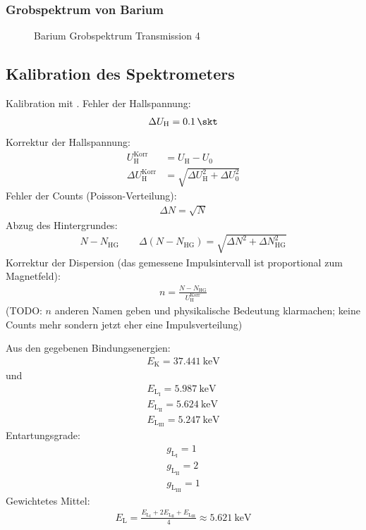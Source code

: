 \documentclass[11pt, a4paper]{article}
\numberwithin{equation}{section}
\begin{document}
\subsubsection{Grobspektrum von Barium}
\begin{figure}[h]
	\centering
	
	\caption{Barium Grobspektrum Transmission 4}
	\label{fig:ba_t4_grob}
\end{figure}

\subsection{Kalibration des Spektrometers}
Kalibration mit .
Fehler der Hallspannung:
\begin{align}
	\Delta U_\mathrm{H} = \SI{0.1}{\skt}
\end{align}
Korrektur der Hallspannung:
\begin{align}
	U_\mathrm{H}^\mathrm{Korr} &= U_\mathrm{H} - U_0 \\
	\Delta U_\mathrm{H}^\mathrm{Korr} &= \sqrt{\Delta U_\mathrm{H}^2 + \Delta U_0^2}
\end{align}
Fehler der Counts (Poisson-Verteilung):
\begin{align}
	\Delta N = \sqrt{N}
\end{align}
Abzug des Hintergrundes:
\begin{align}
	N - N_\mathrm{HG} \qquad \Delta(N - N_\mathrm{HG}) = \sqrt{\Delta N^2 + \Delta N_\mathrm{HG}^2}
\end{align}
Korrektur der Dispersion (das gemessene Impulsintervall ist proportional zum Magnetfeld):
\begin{align}
	n = \frac{N-N_\mathrm{HG}}{U_\mathrm{H}^\mathrm{Korr}}
\end{align}
(TODO: $n$ anderen Namen geben und physikalische Bedeutung klarmachen; keine Counts mehr sondern jetzt eher eine Impulsverteilung)

Aus den gegebenen Bindungsenergien:
\begin{align*}
	E_\mathrm{K} = \SI{37,441}{\kilo\electronvolt}
\end{align*}
und
\begin{align*}
	E_{\mathrm{L}_{\mathrm{I}}} = \SI{5,987}{\kilo\electronvolt} \\
	E_{\mathrm{L}_{\mathrm{II}}} = \SI{5,624}{\kilo\electronvolt} \\
	E_{\mathrm{L}_{\mathrm{III}}} = \SI{5,247}{\kilo\electronvolt}
\end{align*}
Entartungsgrade:
\begin{align*}
	g_{\mathrm{L}_{\mathrm{I}}} = \num{1} \\
	g_{\mathrm{L}_{\mathrm{II}}} = \num{2} \\
	g_{\mathrm{L}_{\mathrm{III}}} = \num{1}
\end{align*}
Gewichtetes Mittel:
\begin{align}
	E_\mathrm{L} = \frac{E_{\mathrm{L}_{\mathrm{I}}} + 2E_{\mathrm{L}_{\mathrm{II}}} + E_{\mathrm{L}_{\mathrm{III}}}}{4} \approx \SI{5,621}{\kilo\electronvolt}
\end{align}
\end{document}
